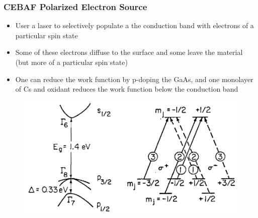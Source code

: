 \documentclass{beamer}
\begin{document}

\begin{frame}
\frametitle{CEBAF Polarized Electron Source}
\begin{itemize}
\item User a laser to selectively populate a the conduction band with electrons of a particular spin state
\item Some of these electrons diffuse to the surface and some leave the material (but more of a particular spin state)
\item One can reduce the work function by p-doping the GaAs, and one monolayer of Cs and oxidant reduces the work function below the conduction band
\end{itemize}
\begin{figure}
\includegraphics[width=0.50\linewidth]{figs/band_structure.png}
\end{figure}

\end{frame}




\end{document}
